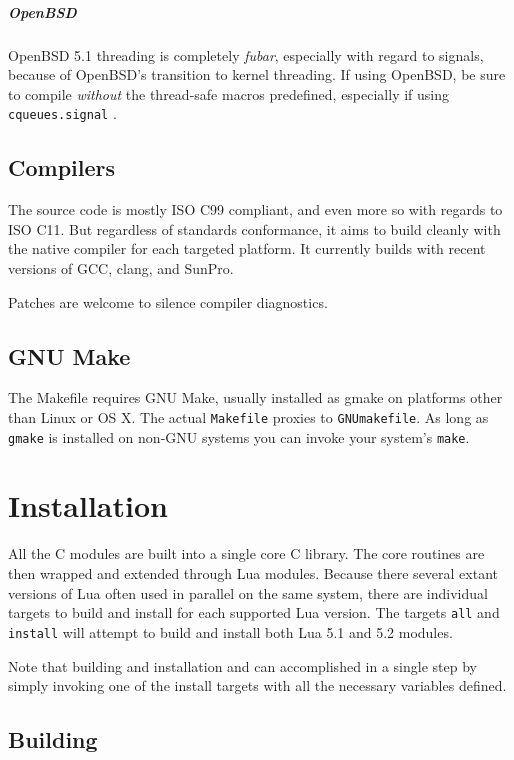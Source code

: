 \documentclass[11pt, oneside]{memoir}
\newcommand{\module}[1]{\texttt{#1} }
\begin{document}
\paragraph{OpenBSD}
OpenBSD 5.1 threading is completely \emph{fubar}, especially with regard to signals, because of OpenBSD's transition to kernel threading. If using OpenBSD, be sure to compile \emph{without} the thread-safe macros predefined, especially if using \module{cqueues.signal}.

\section{Compilers}

The source code is mostly ISO C99 compliant, and even more so with regards to ISO C11. But regardless of standards conformance, it aims to build cleanly with the native compiler for each targeted platform. It currently builds with recent versions of GCC, clang, and SunPro.

Patches are welcome to silence compiler diagnostics.

\section{GNU Make}

The Makefile requires GNU Make, usually installed as gmake on platforms other than Linux or OS X. The actual \texttt{Makefile} proxies to \texttt{GNUmakefile}. As long as \texttt{gmake} is installed on non-GNU systems you can invoke your system's \texttt{make}.

\chapter{Installation}

All the C modules are built into a single core C library. The core routines are then wrapped and extended through Lua modules. Because there several extant versions of Lua often used in parallel on the same system, there are individual targets to build and install for each supported Lua version. The targets \texttt{all} and \texttt{install} will attempt to build and install both Lua 5.1 and 5.2 modules.

Note that building and installation and can accomplished in a single step by simply invoking one of the install targets with all the necessary variables defined.

\section{Building}
\end{document}
